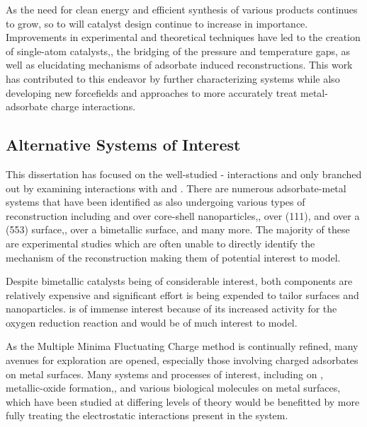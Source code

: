 As the need for clean energy and efficient synthesis of various products
continues to grow, so to will catalyst design continue to increase in
importance.  Improvements in experimental and theoretical techniques have led
to the creation of single-atom catalysts,\citep{Qiao:2011zp, Yang:2013sf}, the bridging of the pressure
and temperature gaps,\citep{Tao:2010aa, Eren:2016qt} as well as elucidating mechanisms of adsorbate
induced reconstructions.\citep{Michalka:2013aa,Kim:2016cr} This work has contributed to this endeavor by
further characterizing  systems while also developing new
forcefields and approaches to more accurately treat metal-adsorbate charge
interactions.



\subsection{Alternative Systems of Interest}
This dissertation has focused on the well-studied - interactions
and only branched out by examining  interactions with  and
.  There are numerous adsorbate-metal systems that have been identified
as also undergoing various types of reconstruction including  and
 over  core-shell nanoparticles,\citep{Tao:2008aa},
 over  (111),\citep{Eren:2016qt}  and  over a (553)
 surface,\citep{Zhang:2015zr},  over a  bimetallic
surface,\citep{Kim:2013mi} and many more. The majority of these are experimental
studies which are often unable to directly identify the mechanism of the
reconstruction making them of potential interest to model.

Despite  bimetallic catalysts being of considerable interest,
both components are relatively expensive and significant effort is being
expended to tailor  surfaces and nanoparticles.
 is of immense interest because of its increased activity for
the oxygen reduction reaction and would be of much interest to
model.\citep{Tuaev:2013fk, Stamenkovic:2007kk,Sneed:2014fj}

As the Multiple Minima Fluctuating Charge method is continually refined, many
avenues for exploration are opened, especially those involving charged
adsorbates on metal surfaces. Many systems and processes of interest, including
 on ,\citep{Xu:0dz} metallic-oxide
formation,\citep{Streitz:1994mw, Fantauzzi:2014pb, Lloyd:2016jt}, and various
biological molecules on metal surfaces,\citep{Padmos:0qf, Mete:2015rc} which
have been studied at differing levels of theory would be benefitted by more
fully treating the electrostatic interactions present in the system. 
